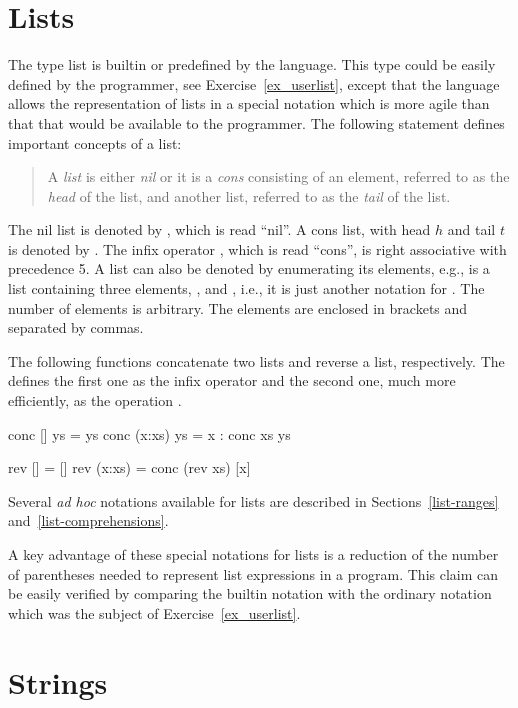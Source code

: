 \section{Lists}
\label{sec-lists}

The type list is builtin or predefined by the language.
This type could be easily defined by the programmer,
see Exercise~\ref{ex_userlist},
except that the language allows the representation of lists in a special
notation which is more agile than that that would be
available to the programmer.
The following statement defines important concepts of a list:
%
\begin{quote}
A \emph{list} is either \emph{nil}
or it is a \emph{cons} consisting of an
element, referred to as the \emph{head} of the list,
and another list, referred to as the \emph{tail} of the list.
\end{quote}
%
The nil list is denoted by \ccode{[]},
which is read ``nil''.
A cons list, with head $h$ and tail $t$ is denoted by .
The infix operator \ccode{:}, which is read ``cons'',
is right associative with precedence 5.
A list can also be denoted by enumerating its
elements, e.g.,
\ccode{[u,v,w]} is a list containing three elements,
,  and , i.e., it is just another
notation for .
The number of elements is arbitrary.
The elements are enclosed in brackets and separated by commas.

The following functions concatenate two lists
and reverse a list, respectively.  
The  defines the first one as the infix operator \ccode{++}
and the second one, much more efficiently, as the operation .
%
\begin{curry}
conc []     ys = ys
conc (x:xs) ys = x : conc xs ys

rev []     = []
rev (x:xs) = conc (rev xs) [x]
\end{curry}
%
Several \emph{ad hoc} notations available for lists are 
described in Sections~\ref{list-ranges} and~\ref{list-comprehensions}.

A key advantage of these special notations for lists is
a reduction of the number of parentheses needed to represent
list expressions in a program.
This claim can be easily verified by comparing the builtin
notation with the ordinary notation which was the subject of
Exercise~\ref{ex_userlist}.


\section{Strings}


